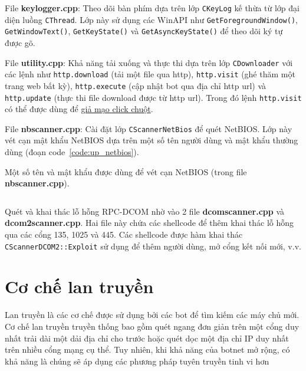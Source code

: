 \begin{exmp}
File \textbf{keylogger.cpp}:
Theo dõi bàn phím dựa trên lớp \texttt{CKeyLog} kế thừa từ lớp đại diện luồng \texttt{CThread}.
Lớp này sử dụng các WinAPI như
\texttt{GetForegroundWindow()},
\texttt{GetWindowText()},
\texttt{GetKeyState()}
và
\texttt{GetAsyncKeyState()}
để theo dõi ký tự được gõ.
\end{exmp}

\begin{exmp}
File \textbf{utility.cpp}:
Khả năng tải xuống và thực thi dựa trên lớp \texttt{CDownloader} với các lệnh như
\texttt{http.download} (tải một file qua http),
\texttt{http.visit} (ghé thăm một trang web bất kỳ),
\texttt{http.execute} (cập nhật bot qua địa chỉ http url)
và
\texttt{http.update} (thực thi file download được từ http url).
Trong đó lệnh \texttt{http.visit} có thể được dùng để
\href{https://en.wikipedia.org/wiki/Click_fraud}{giả mạo click chuột}.
\end{exmp}

\begin{exmp}
File \textbf{nbscanner.cpp}: Cài đặt lớp \texttt{CScannerNetBios} để quét NetBIOS.
Lớp này vét cạn mật khẩu NetBIOS dựa trên một số tên người dùng và mật khẩu
thường dùng (đoạn code~\ref{code:up_netbios}).
\end{exmp}

\begin{listing}[ht]
	\caption{Một số tên và mật khẩu được dùng để vét cạn NetBIOS (trong file \textbf{nbscanner.cpp}).}\label{code:up_netbios}
	\inputminted{cpp}{./listings/upass_netbios.cpp}
\end{listing}

\begin{exmp}
Quét và khai thác lỗ hỗng RPC-DCOM nhờ vào 2 file \textbf{dcomscanner.cpp} và \textbf{dcom2scanner.cpp}.
Hai file này chứa các shellcode để thêm khai thác lỗ hỗng qua các cổng 135, 1025 và 445.
Các shellcode được hàm khai thác \texttt{CScannerDCOM2::Exploit} sử dụng để thêm người dùng,
mở cổng kết nối mới, v.v.
\end{exmp}

\section{Cơ chế lan truyền}
Lan truyền là các cơ chế được sử dụng bởi các bot để tìm kiếm các máy chủ mới.
Cơ chế lan truyền truyền thống bao gồm quét ngang đơn giản trên một cổng duy nhất
trải dài một dải địa chỉ cho trước hoặc quét dọc một địa chỉ IP duy nhất trên nhiều cổng mạng cụ thể.
Tuy nhiên, khi khả năng của botnet mở rộng, có khả năng là chúng sẽ áp dụng các phương pháp tuyên truyền tinh vi hơn

